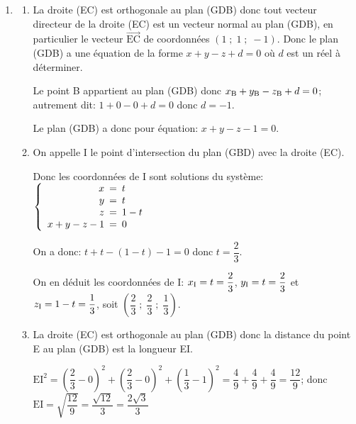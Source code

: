 \documentclass[10pt]{article}
\providecommand{\vectt}[1]{\overrightarrow{\mathrm{#1}}}
\providecommand{\ds}{\displaystyle}
\begin{document}
\begin{enumerate}
$\vectt{EC}.\vectt{GB}=1\times 0 + 1\times (-1) + (-1)\times (-1)=0-1+1=0$ donc $\vectt{EC}\perp\vectt{GB}$

$\vectt{EC}.\vectt{BD}=1\times (-1) + 1\times 1 + (-1)\times 0=-1+1+0=0$ donc $\vectt{EC}\perp\vectt{BD}$

Le vecteur $\vectt{EC}$ est orthogonal à deux vecteurs directeurs du plan (GDB) donc la droite (EC) est orthogonale au plan (GDB).

\item 
	\begin{enumerate}
		\item 
La droite (EC) est orthogonale au plan (GDB) donc tout vecteur directeur de la droite (EC) est un vecteur normal au plan (GDB), en particulier le vecteur $\vectt{EC}$ de coordonnées $(1\;;\;1\;;\;-1)$.
Donc le plan (GDB) a une équation de la forme $x+y-z+d=0$ où $d$ est un réel à déterminer.

Le point B appartient au plan (GDB) donc $x_{\text B} + y_{\text B} -z_{\text B}+d=0$; autrement dit: $1+0-0+d=0$ donc $d=-1$.

Le plan (GDB) a donc pour équation: $x+y-z-1=0$.
			
		\item 
On appelle I le point d'intersection du plan (GBD) avec la droite (EC).

Donc les coordonnées de I sont solutions du système:
$\left \{
\begin{array}{r !{=} l}
x	& t\\
y & t\\
z & 1-t\\
x+y-z-1 & 0
\end{array}
\right .$

On a donc: $t+t-(1-t)-1=0$ donc $t=\dfrac{2}{3}$.

On en déduit les coordonnées de I:
$x_{\text I}=t=\dfrac{2}{3}$, $y_{\text I}=t=\dfrac{2}{3}$ et $z_{\text I}=1-t=\dfrac{1}{3}$,
soit $\left( \dfrac{2}{3}\;;\;\dfrac{2}{3}\;;\;\dfrac{1}{3}\right )$. 
		
		\item 
La droite (EC) est orthogonale au plan (GDB) donc la distance du point E au plan (GDB) est la longueur EI.

$\text{EI}^2 = \left ( \dfrac{2}{3} - 0\right )^2 + \left ( \dfrac{2}{3} - 0\right )^2 + \left ( \dfrac{1}{3} - 1\right )^2 = \dfrac{4}{9}+\dfrac{4}{9}+\dfrac{4}{9}=\dfrac{12}{9}$;
donc $\text{EI} = \ds\sqrt{\dfrac{12}{9}} = \dfrac{\ds\sqrt{12}}{3}=\dfrac{2\sqrt{3}}{3}$


\end{enumerate}
\end{enumerate}
\end{document}
